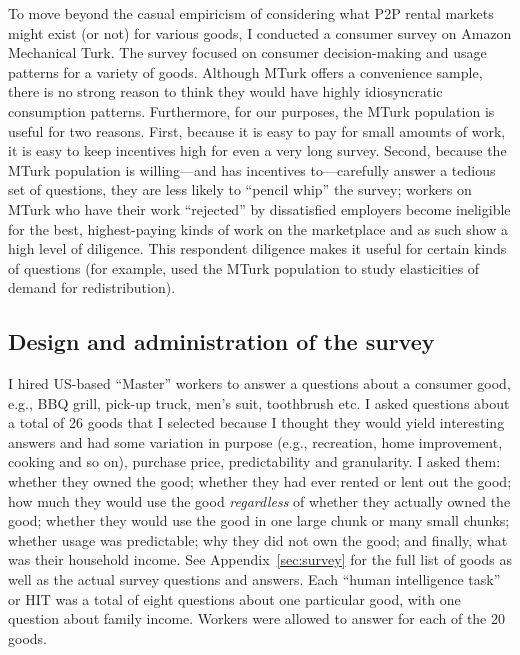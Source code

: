 \documentclass[11pt]{article}
\begin{document}
To move beyond the casual empiricism of considering what P2P rental markets might exist (or not) for various goods, I conducted a consumer survey on Amazon Mechanical Turk. 
The survey focused on consumer decision-making and usage patterns for a variety of goods. 
Although MTurk offers a convenience sample, there is no strong reason to think they would have highly idiosyncratic consumption patterns. 
Furthermore, for our purposes, the MTurk population is useful for two reasons. 
First, because it is easy to pay for small amounts of work, it is easy to keep incentives high for even a very long survey. 
Second, because the MTurk population is willing---and has incentives to---carefully answer a tedious set of questions, they are less likely to ``pencil whip'' the survey; 
workers on MTurk who have their work ``rejected'' by dissatisfied employers become ineligible for the best, highest-paying kinds of work on the marketplace and as such show a high level of diligence.    
This respondent diligence makes it useful for certain kinds of questions (for example, \cite{kuziemko2013elastic} used the MTurk population to study elasticities of demand for redistribution).  

\subsection{Design and administration of the survey}
I hired US-based ``Master'' workers to answer a questions about a consumer good, e.g., BBQ grill, pick-up truck, men's suit, toothbrush etc.
I asked questions about a total of 26 goods that I selected because I thought they would yield interesting answers and had some variation in purpose (e.g., recreation, home improvement, cooking and so on), purchase price, predictability and granularity. 
I asked them: whether they owned the good; whether they had ever rented or lent out the good; how much they would use the good \emph{regardless} of whether they actually owned the good; whether they would use the good in one large chunk or many small chunks; whether usage was predictable; why they did not own the good; and finally, what was their household income. 
See Appendix~\ref{sec:survey} for the full list of goods as well as the actual survey questions and answers.  
Each ``human intelligence task'' or HIT was a total of eight questions about one particular good, with one question about family income. 
Workers were allowed to answer for each of the 20 goods.  
 
\end{document}
